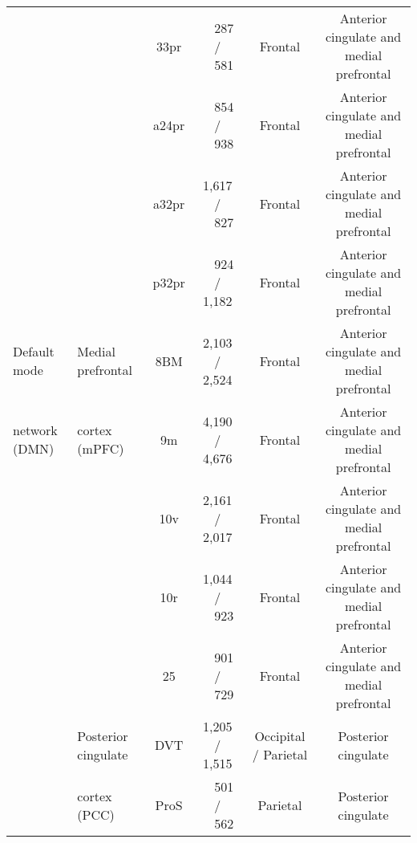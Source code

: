 \begin{table*}[t]
{\begin{tabular}{ l | l | c | c | c | c }
                                      &                                 & 33pr                  & ~~287 / ~~581         & Frontal               & Anterior cingulate and medial prefrontal  \\
                                      &                                 & a24pr                 & ~~854 / ~~938         & Frontal               & Anterior cingulate and medial prefrontal  \\
                                      &                                 & a32pr                 & 1,617 / ~~827         & Frontal               & Anterior cingulate and medial prefrontal  \\
                                      &                                 & p32pr                 & ~~924 / 1,182         & Frontal               & Anterior cingulate and medial prefrontal  \\
      \midrule
      Default mode                    & Medial prefrontal               & 8BM                   & 2,103 / 2,524         & Frontal               & Anterior cingulate and medial prefrontal  \\
      network (DMN)                   & cortex (mPFC)                   & 9m                    & 4,190 / 4,676         & Frontal               & Anterior cingulate and medial prefrontal  \\
                                      &                                 & 10v                   & 2,161 / 2,017         & Frontal               & Anterior cingulate and medial prefrontal  \\
                                      &                                 & 10r                   & 1,044 / ~~923         & Frontal               & Anterior cingulate and medial prefrontal  \\
                                      &                                 & 25                    & ~~901 / ~~729         & Frontal               & Anterior cingulate and medial prefrontal  \\
                                      \cmidrule{2-6}
                                      & Posterior cingulate             & DVT                   & 1,205 / 1,515         & Occipital / Parietal  & Posterior cingulate                       \\
                                      & cortex (PCC)                    & ProS                  & ~~501 / ~~562         & Parietal              & Posterior cingulate                       \\

\end{tabular}}
\end{table*}
